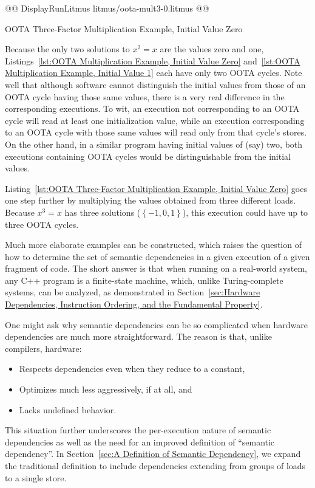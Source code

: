 \documentclass[10]{article}
\begin{document}
\begin{listing}[tbp]
@@ DisplayRunLitmus litmus/oota-mult3-0.litmus @@
\caption{OOTA Three-Factor Multiplication Example, Initial Value Zero}
\label{lst:OOTA Three-Factor Multiplication Example, Initial Value Zero}
\end{listing}

Because the only two solutions to $x^2 = x$ are the values zero and one,
Listings~\ref{lst:OOTA Multiplication Example, Initial Value Zero}
and~\ref{lst:OOTA Multiplication Example, Initial Value 1}
each have only two OOTA cycles.
Note well that although software cannot distinguish the initial
values from those of an OOTA cycle having those same values, there is
a very real difference in the corresponding executions.
To wit, an execution not corresponding to an OOTA cycle will read at
least one initialization value, while an execution corresponding to an
OOTA cycle with those same values will read only from that cycle's stores.
On the other hand, in a similar program having initial values of (say)
two, both executions containing OOTA cycles would be distinguishable
from the initial values.

Listing~\ref{lst:OOTA Three-Factor Multiplication Example, Initial Value Zero}
goes one step further by multiplying the values obtained from three
different loads.
Because $x^3 = x$ has three solutions ($\left\{ -1, 0, 1 \right\}$),
this execution could have up to three OOTA cycles.

Much more elaborate examples can be constructed,
which raises the question of how to determine the set of semantic
dependencies in a given execution of a given fragment of code.
The short answer is that when running on a real-world system, 
any C++ program is a finite-state machine, which, unlike Turing-complete
systems, can be analyzed, as demonstrated in
Section~\ref{sec:Hardware Dependencies, Instruction Ordering, and the Fundamental Property}.

One might ask why semantic dependencies can be so complicated when hardware
dependencies are much more straightforward.
The reason is that, unlike compilers, hardware:
\begin{itemize}
\item	Respects dependencies even when they reduce to a constant,
\item	Optimizes much less aggressively, if at all, and
\item	Lacks undefined behavior.
\end{itemize}
This situation further underscores the per-execution nature of semantic
dependencies as well as the need for an improved definition of ``semantic
dependency''.
In
Section~\ref{sec:A Definition of Semantic Dependency},
we expand the traditional definition to include dependencies extending
from groups of loads to a single store.
\end{document}

